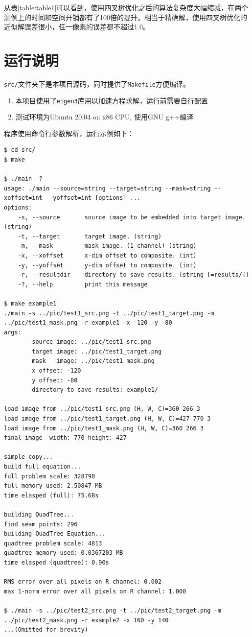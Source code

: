 \documentclass[UTF8, onecolumn, a4paper]{article}
\begin{document}
从表\ref{table:table1}可以看到，使用四叉树优化之后的算法复杂度大幅缩减，在两个测例上的时间和空间开销都有了100倍的提升。相当于精确解，使用四叉树优化的近似解误差很小，任一像素的误差都不超过1.0。


\appendix
\section{运行说明}
\texttt{src/}文件夹下是本项目源码，同时提供了\texttt{Makefile}方便编译。
\begin{enumerate}
	\item 本项目使用了\texttt{eigen3}库用以加速方程求解，运行前需要自行配置
	\item 测试环境为Ubuntu 20.04 on x86 CPU, 使用GNU g++编译
\end{enumerate}
程序使用命令行参数解析，运行示例如下：

\begin{lstlisting}[title=运行示例]
$ cd src/
$ make

$ ./main -?
usage: ./main --source=string --target=string --mask=string --xoffset=int --yoffset=int [options] ...
options:
	-s, --source       source image to be embedded into target image. (string)
	-t, --target       target image. (string)
	-m, --mask         mask image. (1 channel) (string)
	-x, --xoffset      x-dim offset to composite. (int)
	-y, --yoffset      y-dim offset to composite. (int)
	-r, --resultdir    directory to save results. (string [=results/])
	-?, --help         print this message

$ make example1
./main -s ../pic/test1_src.png -t ../pic/test1_target.png -m ../pic/test1_mask.png -r example1 -x -120 -y -80
args:
		source image: ../pic/test1_src.png
		target image: ../pic/test1_target.png
		mask   image: ../pic/test1_mask.png
		x offset: -120
		y offset: -80
		directory to save results: example1/

load image from ../pic/test1_src.png (H, W, C)=360 266 3
load image from ../pic/test1_target.png (H, W, C)=427 770 3
load image from ../pic/test1_mask.png (H, W, C)=360 266 3
final image  width: 770 height: 427

simple copy...
build full equation...
full problem scale: 328790
full memory used: 2.50847 MB
time elasped (full): 75.68s

building QuadTree...
find seam points: 296
building QuadTree Equation...
quadtree problem scale: 4813
quadtree memory used: 0.0367203 MB
time elasped (quadtree): 0.90s

RMS error over all pixels on R channel: 0.002
max 1-norm error over all pixels on R channel: 1.000

$ ./main -s ../pic/test2_src.png -t ../pic/test2_target.png -m ../pic/test2_mask.png -r example2 -x 160 -y 140
...(Omitted for brevity)
\end{lstlisting}
\end{document}
